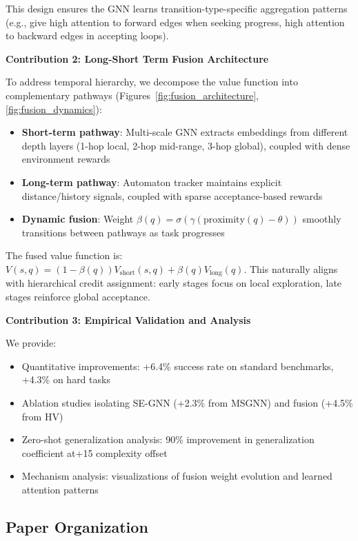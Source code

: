 \documentclass[conference]{IEEEtran}
\begin{document}
This design ensures the GNN learns transition-type-specific aggregation patterns (e.g., give high attention to forward edges when seeking progress, high attention to backward edges in accepting loops).

\textbf{Contribution 2: Long-Short Term Fusion Architecture}

To address temporal hierarchy, we decompose the value function into complementary pathways (Figures~\ref{fig:fusion_architecture}, \ref{fig:fusion_dynamics}):
\begin{itemize}
    \item \textbf{Short-term pathway}: Multi-scale GNN extracts embeddings from different depth layers (1-hop local, 2-hop mid-range, 3-hop global), coupled with dense environment rewards
    \item \textbf{Long-term pathway}: Automaton tracker maintains explicit distance/history signals, coupled with sparse acceptance-based rewards  
    \item \textbf{Dynamic fusion}: Weight $\beta(q) = \sigma(\gamma(\text{proximity}(q) - \theta))$ smoothly transitions between pathways as task progresses
\end{itemize}

The fused value function is: $V(s,q) = (1-\beta(q)) V_{\text{short}}(s,q) + \beta(q) V_{\text{long}}(q)$. This naturally aligns with hierarchical credit assignment: early stages focus on local exploration, late stages reinforce global acceptance.

\textbf{Contribution 3: Empirical Validation and Analysis}

We provide:
\begin{itemize}
    \item Quantitative improvements: +6.4\% success rate on standard benchmarks, +4.3\% on hard tasks
    \item Ablation studies isolating SE-GNN (+2.3\% from MSGNN) and fusion (+4.5\% from HV)  
    \item Zero-shot generalization analysis: 90\% improvement in generalization coefficient at+15 complexity offset
    \item Mechanism analysis: visualizations of fusion weight evolution and learned attention patterns
\end{itemize}

\subsection{Paper Organization}
\end{document}
